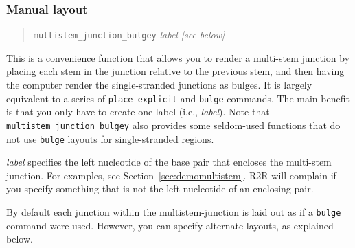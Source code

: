 \documentclass[letterpaper,12pt]{report}
\newcommand{\example}[1]{
\begin{quote}
{\raggedright
#1
}
\end{quote}
}
\begin{document}
\subsubsection{Manual layout}
\label{sec:multistemjunctionbulgey}
\example{
{\tt multistem\_junction\_bulgey}  \textit{label}  \textit{[see below]}
}

This is a convenience function that allows you to render a multi-stem
junction by placing each stem in the junction relative to the previous
stem, and then having the computer render the single-stranded junctions
as bulges.  It is largely equivalent to a series of {\tt place\_explicit} and {\tt bulge}
commands.  The main benefit is that you only have to create one label
(i.e., \textit{label}).
Note that {\tt multistem\_junction\_bulgey} also provides some seldom-used functions that do not use {\tt bulge} layouts for single-stranded regions.

\textit{label }specifies the left nucleotide of the base pair that encloses the
multi-stem junction. For examples, 
see Section~\ref{sec:demomultistem}.
R2R will complain if you specify something that is not the
left nucleotide of an enclosing pair.

By default each junction within the multistem-junction is laid out as if a {\tt bulge} command
were used.
However, you can specify alternate layouts, as explained below.
\end{document}
